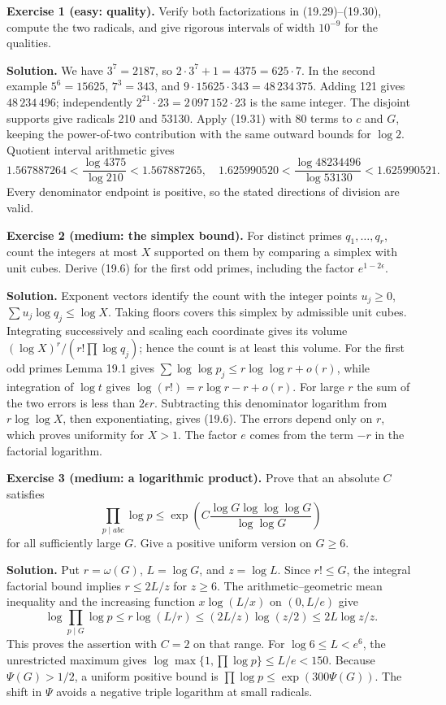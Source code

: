 \documentclass[
  11pt,
  a4paper,
]{article}
\begin{document}
\textbf{Exercise 1 (easy: quality).} Verify both factorizations in
(19.29)--(19.30), compute the two radicals, and give rigorous intervals
of width \(10^{-9}\) for the qualities.

\textbf{Solution.} We have \(3^7=2187\), so
\(2\cdot3^7+1=4375=625\cdot7\). In the second example \(5^6=15625\),
\(7^3=343\), and \(9\cdot15625\cdot343=48\,234\,375\). Adding 121 gives
\(48\,234\,496\); independently \(2^{21}\cdot23=2\,097\,152\cdot23\) is
the same integer. The disjoint supports give radicals 210 and 53130.
Apply (19.31) with 80 terms to \(c\) and \(G\), keeping the power-of-two
contribution with the same outward bounds for \(\log2\). Quotient
interval arithmetic gives \[
 1.567887264<\frac{\log4375}{\log210}<1.567887265,
 \quad
 1.625990520<\frac{\log48234496}{\log53130}<1.625990521.
\] Every denominator endpoint is positive, so the stated directions of
division are valid.

\textbf{Exercise 2 (medium: the simplex bound).} For distinct primes
\(q_1,\ldots,q_r\), count the integers at most \(X\) supported on them
by comparing a simplex with unit cubes. Derive (19.6) for the first odd
primes, including the factor \(e^{1-2\epsilon}\).

\textbf{Solution.} Exponent vectors identify the count with the integer
points \(u_j\ge0\), \(\sum u_j\log q_j\le\log X\). Taking floors covers
this simplex by admissible unit cubes. Integrating successively and
scaling each coordinate gives its volume
\((\log X)^r/(r!\prod\log q_j)\); hence the count is at least this
volume. For the first odd primes Lemma 19.1 gives
\(\sum\log\log p_j\le r\log\log r+o(r)\), while integration of
\(\log t\) gives \(\log(r!)=r\log r-r+o(r)\). For large \(r\) the sum of
the two errors is less than \(2\epsilon r\). Subtracting this
denominator logarithm from \(r\log\log X\), then exponentiating, gives
(19.6). The errors depend only on \(r\), which proves uniformity for
\(X>1\). The factor \(e\) comes from the term \(-r\) in the factorial
logarithm.

\textbf{Exercise 3 (medium: a logarithmic product).} Prove that an
absolute \(C\) satisfies \[
 \prod_{p\mid abc}\log p
 \le\exp\left(C\frac{\log G\log\log\log G}
                              {\log\log G}\right)
\] for all sufficiently large \(G\). Give a positive uniform version on
\(G\ge6\).

\textbf{Solution.} Put \(r=\omega(G)\), \(L=\log G\), and \(z=\log L\).
Since \(r!\le G\), the integral factorial bound implies \(r\le2L/z\) for
\(z\ge6\). The arithmetic--geometric mean inequality and the increasing
function \(x\log(L/x)\) on \((0,L/e)\) give \[
 \log\prod_{p\mid G}\log p
 \le r\log(L/r)\le(2L/z)\log(z/2)
 \le2L\log z/z.
\] This proves the assertion with \(C=2\) on that range. For
\(\log6\le L<e^6\), the unrestricted maximum gives
\(\log\max\{1,\prod\log p\}\le L/e<150\). Because \(\Psi(G)>1/2\), a
uniform positive bound is \(\prod\log p\le\exp(300\Psi(G))\). The shift
in \(\Psi\) avoids a negative triple logarithm at small radicals.
\end{document}
